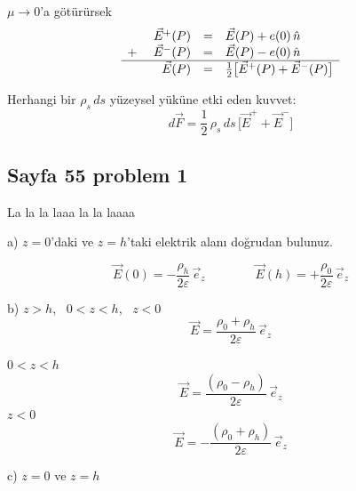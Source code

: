 \documentclass[11pt,a4paper]{article}
\begin{document}
$\mu\to 0$'a götürürsek
\[
\begin{array}{rrcl}
 & \vec E^{+}(P) &=& \vec E(P) + e(0)\,\hat n \\
+\ & \vec E^{-}(P) &=& \vec E(P) - e(0)\,\hat n \\ \hline
 & \vec E(P) &=& \tfrac12\bigl[\vec E^{+}(P)+\vec E^{-}(P)\bigr]
\end{array}
\]

Herhangi bir $\rho_s\,ds$ yüzeysel yüküne etki eden kuvvet:
\[ d\vec F = \frac12\,\rho_s\,ds\,\bigl[\vec E^{+}+\vec E^{-}\bigr] \]

\subsection{Sayfa 55 problem 1}
La la la laaa la la laaaa

\begin{center}
\end{center}

a) $z=0$'daki ve $z=h$'taki elektrik alanı doğrudan bulunuz.

\hspace{1.5em}{\small sadece $\rho_h$'ın etkisi var diyelim}
\[ \vec E(0) = -\frac{\rho_h}{2\varepsilon}\,\vec e_z \qquad\qquad \vec E(h) = +\frac{\rho_0}{2\varepsilon}\,\vec e_z \]

b) $z>h$, \ $0<z<h$, \ $z<0$
\[ \vec E = \frac{\rho_0+\rho_h}{2\varepsilon}\,\vec e_z \]

$0<z<h$
\[ \vec E = \frac{(\rho_0-\rho_h)}{2\varepsilon}\,\vec e_z \]
$z<0$
\[ \vec E = -\frac{(\rho_0+\rho_h)}{2\varepsilon}\,\vec e_z \]

c) $z=0$ ve $z=h$
\end{document}
